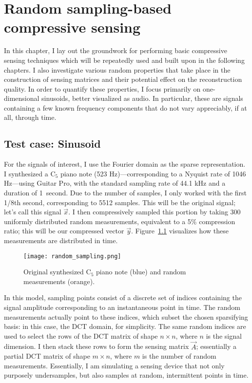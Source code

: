 \chapter{Random sampling-based compressive sensing}
\label{chap:random-cs}

In this chapter, I lay out the groundwork for performing basic compressive sensing techniques which will be repeatedly used and built upon in the following chapters. I also investigate various random properties that take place in the construction of sensing matrices and their potential effect on the reconstruction quality. In order to quantify these properties, I focus primarily on one-dimensional sinusoids, better visualized as audio. In particular, these are signals containing a few known frequency components that do not vary appreciably, if at all, through time.

\section{Test case: Sinusoid}
\label{sec:1dsin}
For the signals of interest, I use the Fourier domain as the sparse representation. I synthesized a C$_5$ piano note (523 Hz)---corresponding to a Nyquist rate of 1046 Hz---using Guitar Pro, with the standard sampling rate of 44.1 kHz and a duration of 1~second. Due to the number of samples, I only worked with the first 1/8th second, corresponding to 5512 samples. This will be the original signal; let's call this signal $\vec{x}$. I then compressively sampled this portion by taking 300 uniformly distributed random measurements, equivalent to a 5\% compression ratio; this will be our compressed vector $\vec{y}$. Figure~\ref{fig:random-sampling} visualizes how these measurements are distributed in time.

\begin{figure}[htb]
	\texttt{[image: random\_sampling.png]}
	\caption{Original synthesized C$_5$ piano note (blue) and random measurements (orange).}
	\label{fig:random-sampling}
\end{figure}

In this model, sampling points consist of a discrete set of indices containing the signal amplitude corresponding to an instantaneous point in time. The random measurements actually point to these indices, which subset the chosen sparsifying basis: in this case, the DCT domain, for simplicity. The same random indices are used to select the rows of the DCT matrix of shape $n \times n$, where $n$ is the signal dimension. I then stack these rows to form the sensing matrix $\vec{A}$; essentially a partial DCT matrix of shape $m \times n$, where $m$ is the number of random measurements. Essentially, I am simulating a sensing device that not only purposely undersamples, but also samples at random, intermittent points in time.

